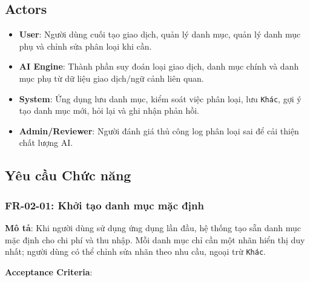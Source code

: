 \subsection{Actors}

\begin{itemize}
\item \textbf{User}: Người dùng cuối tạo giao dịch, quản lý danh mục, quản lý danh mục phụ và chỉnh sửa phân loại khi cần.
\item \textbf{AI Engine}: Thành phần suy đoán loại giao dịch, danh mục chính và danh mục phụ từ dữ liệu giao dịch/ngữ cảnh liên quan.
\item \textbf{System}: Ứng dụng lưu danh mục, kiểm soát việc phân loại, lưu \texttt{Khác}, gợi ý tạo danh mục mới, hỏi lại và ghi nhận phản hồi.
\item \textbf{Admin/Reviewer}: Người đánh giá thủ công log phân loại sai để cải thiện chất lượng AI.
\end{itemize}
\subsection{Yêu cầu Chức năng}



\subsubsection{FR-02-01: Khởi tạo danh mục mặc định}

\textbf{Mô tả}: Khi người dùng sử dụng ứng dụng lần đầu, hệ thống tạo sẵn danh mục mặc định cho chi phí và thu nhập. Mỗi danh mục chỉ cần một nhãn hiển thị duy nhất; người dùng có thể chỉnh sửa nhãn theo nhu cầu, ngoại trừ \texttt{Khác}.



\textbf{Acceptance Criteria}:

